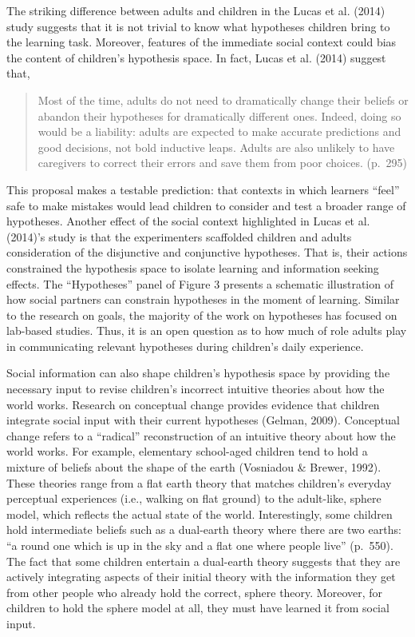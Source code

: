 \documentclass[oneside]{report}
\begin{document}
The striking difference between adults and children in the Lucas et al.
(2014) study suggests that it is not trivial to know what hypotheses
children bring to the learning task. Moreover, features of the immediate
social context could bias the content of children's hypothesis space. In
fact, Lucas et al. (2014) suggest that,
\begin{quote}
Most of the time, adults do not need to dramatically change their
beliefs or abandon their hypotheses for dramatically different ones.
Indeed, doing so would be a liability: adults are expected to make
accurate predictions and good decisions, not bold inductive leaps.
Adults are also unlikely to have caregivers to correct their errors and
save them from poor choices. (p.~295)
\end{quote}
\noindent This proposal makes a testable prediction: that contexts in
which learners ``feel'' safe to make mistakes would lead children to
consider and test a broader range of hypotheses. Another effect of the
social context highlighted in Lucas et al. (2014)'s study is that the
experimenters scaffolded children and adults consideration of the
disjunctive and conjunctive hypotheses. That is, their actions
constrained the hypothesis space to isolate learning and information
seeking effects. The ``Hypotheses'' panel of Figure 3 presents a
schematic illustration of how social partners can constrain hypotheses
in the moment of learning. Similar to the research on goals, the
majority of the work on hypotheses has focused on lab-based studies.
Thus, it is an open question as to how much of role adults play in
communicating relevant hypotheses during children's daily experience.

Social information can also shape children's hypothesis space by
providing the necessary input to revise children's incorrect intuitive
theories about how the world works. Research on conceptual change
provides evidence that children integrate social input with their
current hypotheses (Gelman, 2009). Conceptual change refers to a
``radical'' reconstruction of an intuitive theory about how the world
works. For example, elementary school-aged children tend to hold a
mixture of beliefs about the shape of the earth (Vosniadou \& Brewer,
1992). These theories range from a flat earth theory that matches
children's everyday perceptual experiences (i.e., walking on flat
ground) to the adult-like, sphere model, which reflects the actual state
of the world. Interestingly, some children hold intermediate beliefs
such as a dual-earth theory where there are two earths: ``a round one
which is up in the sky and a flat one where people live'' (p.~550). The
fact that some children entertain a dual-earth theory suggests that they
are actively integrating aspects of their initial theory with the
information they get from other people who already hold the correct,
sphere theory. Moreover, for children to hold the sphere model at all,
they must have learned it from social input.
\end{document}
